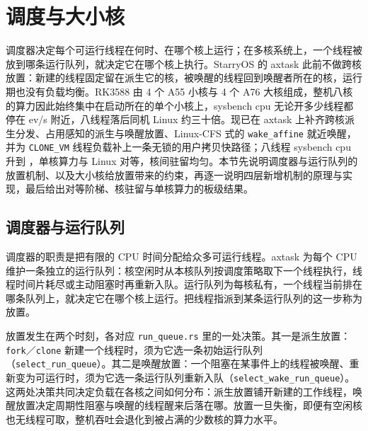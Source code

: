 \section{调度与大小核}

调度器决定每个可运行线程在何时、在哪个核上运行；在多核系统上，一个线程被放到哪条运行队列，就决定它在哪个核上执行。StarryOS 的 axtask 此前不做跨核放置：新建的线程固定留在派生它的核，被唤醒的线程回到唤醒者所在的核，运行期也没有负载均衡。RK3588 由 4 个 A55 小核与 4 个 A76 大核组成，整机八核的算力因此始终集中在启动所在的单个小核上，sysbench cpu 无论开多少线程都停在 \nLadderBase{} ev/s 附近，八线程落后同机 Linux 约三十倍。现已在 axtask 上补齐跨核派生分发、占用感知的派生与唤醒放置、Linux-CFS 式的 \texttt{wake\_affine} 就近唤醒，并为 \texttt{CLONE\_VM} 线程负载补上一条无锁的用户拷贝快路径；八线程 sysbench cpu 升到 ，单核算力与 Linux 对等，核间驻留均匀。本节先说明调度器与运行队列的放置机制、以及大小核给放置带来的约束，再逐一说明四层新增机制的原理与实现，最后给出对等阶梯、核驻留与单核算力的板级结果。


\subsection{调度器与运行队列}

调度器的职责是把有限的 CPU 时间分配给众多可运行线程。axtask 为每个 CPU 维护一条独立的运行队列：核空闲时从本核队列按调度策略取下一个线程执行，线程时间片耗尽或主动阻塞时再重新入队。运行队列为每核私有，一个线程当前排在哪条队列上，就决定它在哪个核上运行。把线程指派到某条运行队列的这一步称为放置。

放置发生在两个时刻，各对应 \texttt{run\_queue.rs} 里的一处决策。其一是派生放置：\texttt{fork}／\texttt{clone} 新建一个线程时，须为它选一条初始运行队列（\texttt{select\_run\_queue}）。其二是唤醒放置：一个阻塞在某事件上的线程被唤醒、重新变为可运行时，须为它选一条运行队列重新入队（\texttt{select\_wake\_run\_queue}）。这两处决策共同决定负载在各核之间如何分布：派生放置铺开新建的工作线程，唤醒放置决定周期性阻塞与唤醒的线程醒来后落在哪。放置一旦失衡，即便有空闲核也无线程可取，整机吞吐会退化到被占满的少数核的算力水平。

